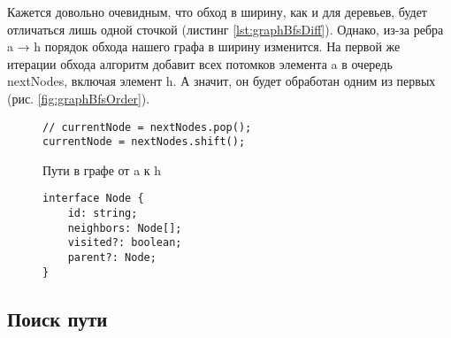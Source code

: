\documentclass[../../article.tex]{subfiles}
\begin{document}
Кажется довольно очевидным, что обход в ширину, как и для деревьев, будет отличаться лишь одной сточкой (листинг \ref{lst:graphBfsDiff}). Однако, из-за ребра {\firacodebold a → h} порядок обхода нашего графа в ширину изменится. На первой же итерации обхода алгоритм добавит всех потомков элемента {\firacodebold a} в очередь {\firacodebold nextNodes}, включая элемент {\firacodebold h}. А значит, он будет обработан одним из первых (рис. \ref{fig:graphBfsOrder}).

\begin{figure}
    \begin{ruledelement}
        \begin{lstlisting}[caption={Отличие обхода в ширину от обхода в глубину}, label={lst:graphBfsDiff}]
// currentNode = nextNodes.pop();
currentNode = nextNodes.shift();
        \end{lstlisting}
    \end{ruledelement}
\end{figure}

\begin{figure}
    \caption{Пути в графе от {\firacodebold a} к {\firacodebold h}}
    \label{fig:pathExposure}
\end{figure}

\begin{figure}
    \begin{ruledelement}
        \begin{lstlisting}[caption={Структура вершины графа для поиска пути}, label={lst:graphStructureSimplePath}]
interface Node {
    id: string;
    neighbors: Node[];
    visited?: boolean;
    parent?: Node;
}
        \end{lstlisting}
    \end{ruledelement}
\end{figure}

\subsection{Поиск пути}
\end{document}
